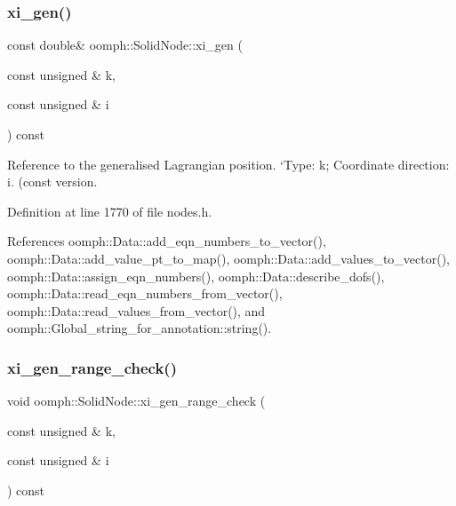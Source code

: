 \mbox{\label{classoomph_1_1SolidNode_a3a02b5a1d7fcf3b78d93f0e727289a6f}} 
\subsubsection{\texorpdfstring{xi\+\_\+gen()}{xi\_gen()}\hspace{0.1cm}{\footnotesize\ttfamily [2/2]}}
{\footnotesize\ttfamily const double\& oomph\+::\+Solid\+Node\+::xi\+\_\+gen (\begin{DoxyParamCaption}\item[{const unsigned \&}]{k,  }\item[{const unsigned \&}]{i }\end{DoxyParamCaption}) const\hspace{0.3cm}{\ttfamily [inline]}}



Reference to the generalised Lagrangian position. `\+Type\textquotesingle{}\+: k; \textquotesingle{}Coordinate direction\+: i. (const version. 



Definition at line 1770 of file nodes.\+h.



References oomph\+::\+Data\+::add\+\_\+eqn\+\_\+numbers\+\_\+to\+\_\+vector(), oomph\+::\+Data\+::add\+\_\+value\+\_\+pt\+\_\+to\+\_\+map(), oomph\+::\+Data\+::add\+\_\+values\+\_\+to\+\_\+vector(), oomph\+::\+Data\+::assign\+\_\+eqn\+\_\+numbers(), oomph\+::\+Data\+::describe\+\_\+dofs(), oomph\+::\+Data\+::read\+\_\+eqn\+\_\+numbers\+\_\+from\+\_\+vector(), oomph\+::\+Data\+::read\+\_\+values\+\_\+from\+\_\+vector(), and oomph\+::\+Global\+\_\+string\+\_\+for\+\_\+annotation\+::string().

\mbox{\label{classoomph_1_1SolidNode_a0c5b916610af540ccc98a09584b8f34f}} 
\subsubsection{\texorpdfstring{xi\+\_\+gen\+\_\+range\+\_\+check()}{xi\_gen\_range\_check()}}
{\footnotesize\ttfamily void oomph\+::\+Solid\+Node\+::xi\+\_\+gen\+\_\+range\+\_\+check (\begin{DoxyParamCaption}\item[{const unsigned \&}]{k,  }\item[{const unsigned \&}]{i }\end{DoxyParamCaption}) const\hspace{0.3cm}{\ttfamily [private]}}



